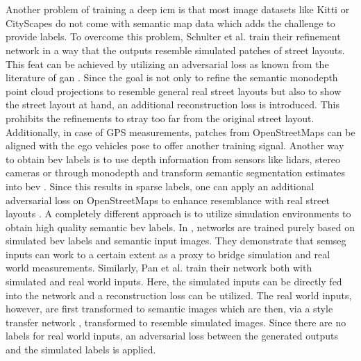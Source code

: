 \\\\ 
Another problem of training a deep \gls{icm} is that most image datasets like Kitti \cite{geiger2013vision} or CityScapes \cite{cordts2016cityscapes} do not come with semantic map data which adds the challenge to provide labels. To overcome this problem, Schulter et al. \cite{schulter2018learning} train their refinement network in a way that the outputs resemble simulated patches of street layouts. This feat can be achieved by utilizing an adversarial loss as known from the literature of \gls{gan} \cite{goodfellow2020generative}. Since the goal is not only to refine the semantic \gls{monodepth} point cloud projections to resemble general real street layouts but also to show the street layout at hand, an additional reconstruction loss is introduced. This prohibits the refinements to stray too far from the original street layout. Additionally, in case of GPS measurements, patches from OpenStreetMaps \cite{haklay2008openstreetmap} can be aligned with the ego vehicles pose to offer another training signal. Another way to obtain \gls{bev} labels is to use depth information from sensors like lidars, stereo cameras or through \gls{monodepth} and transform semantic segmentation estimates into \gls{bev} \cite{mani2020monolayout,lu2019monocular}. Since this results in sparse labels, one can apply an additional adversarial loss on OpenStreetMaps to enhance resemblance with real street layouts \cite{mani2020monolayout}. A completely different approach is to utilize simulation environments to obtain high quality semantic \gls{bev} labels. In \cite{reiher2020sim2real}, networks are trained purely based on simulated \gls{bev} labels and semantic input images. They demonstrate that \gls{semseg} inputs can work to a certain extent as a proxy to bridge simulation and real world measurements. Similarly, Pan et al. \cite{pan2020cross} train their network both with simulated and real world inputs. Here, the simulated inputs can be directly fed into the network and a reconstruction loss can be utilized. The real world inputs, however, are first transformed to semantic images which are then, via a style transfer network \cite{jing2019neural}, transformed to resemble simulated images. Since there are no labels for real world inputs, an adversarial loss between the generated outputs and the simulated labels is applied.
\\\\
